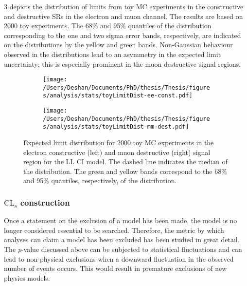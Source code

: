 \cref{fig:toyDist} depicts the distribution of limits from toy MC experiments in the constructive and destructive SRs in the electron and muon channel. The results are based on 2000 toy experiments. The 68\% and 95\% quantiles of the distribution corresponding to the one and two sigma error bands, respectively, are indicated on the distributions by the yellow and green bands. Non-Gaussian behaviour observed in the distributions lead to an asymmetry in the expected limit uncertainty; this is especially prominent in the muon destructive signal regions. 

\begin{figure}[!htpb]
    \centering
    \begin{subfigure}[b]{0.49\textwidth}
        \centering
        \texttt{[image: /Users/Deshan/Documents/PhD/thesis/Thesis/figures/analysis/stats/toyLimitDist-ee-const.pdf]}
        \label{fig:toyDist1}
    \end{subfigure}
    \begin{subfigure}[b]{0.49\textwidth}
        \centering
        \texttt{[image: /Users/Deshan/Documents/PhD/thesis/Thesis/figures/analysis/stats/toyLimitDist-mm-dest.pdf]}
        \label{fig:toyDist2}
    \end{subfigure}
    \caption[Expected limit distribution for 2000 toy MC experiments.]{Expected limit distribution for 2000 toy MC experiments in the electron constructive (left) and muon destructive (right) signal region for the LL CI model. The dashed line indicates the median of the distribution. The green and yellow bands correspond to the 68\% and 95\% quantiles, respectively, of the distribution.}
    \label{fig:toyDist}
\end{figure}

\subsubsection{$\mathrm{CL}_\mathrm{s}$ construction}
Once a statement on the exclusion of a model has been made, the model is no longer considered essential to be searched. Therefore, the metric by which analyses can claim a model has been excluded has been studied in great detail. The \emph{p}-value discussed above can be subjected to statistical fluctuations and can lead to non-physical exclusions when a downward fluctuation in the observed number of events occurs. This would result in premature exclusions of new physics models. 

